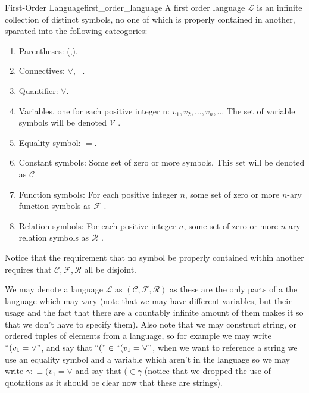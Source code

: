 \begin{definition}{First-Order Language}{first_order_language}
    A first order language $\mathcal{L}$ is an infinite collection of distinct
    symbols, no one of which is properly contained in another, sparated into the
    following cateogories:
	\begin{enumerate}
		\item Parentheses: (,).
		\item Connectives: $\lor, \neg$.
		\item Quantifier: $\forall$.
        \item Variables, one for each positive integer n: $v_{1}, v_{2}, \ldots,
        v_{n}, \ldots$ The set of variable symbols will be denoted $ \mathcal{ V
        }   $ .
        \item Equality symbol: $=$.
        \item Constant symbols: Some set of zero or more symbols. This set will
        be denoted as $ \mathcal{ C }   $ 
        \item Function symbols: For each positive integer $n$, some set of zero
        or more $n$-ary function symbols as $ \mathcal{ F }  $ .
        \item Relation symbols: For each positive integer $n$, some set of zero
        or more $n$-ary relation symbols as $ \mathcal{ R }  $ .
	\end{enumerate}
	Notice that the requirement that no symbol be properly contained within
	another requires that $ \mathcal{ C } , \mathcal{ F } , \mathcal{ R }     $
	all be disjoint.
\end{definition}
We may denote a language $ \mathcal{ L }   $ as $ \left( \mathcal{ C } ,
\mathcal{ F } , \mathcal{ R }      \right)  $ as these are the only parts of a
the language which may vary (note that we may have different variables, but
their usage and the fact that there are a countably infinite amount of them
makes it so that we don't have to specify them). Also note that we may construct
string, or ordered tuples of elements from a language, so for example we may
write $ ``( v _{ 1 } = \lor"  $, and say that $ ``(" \in ``( v _{ 1 } = \lor"
$, when we want to reference a string we use an equality symbol and a variable
which aren't in the language so we may write $ \gamma :\equiv ( v _{ 1 } = \lor
$ and say that $ ( \in  \gamma $ (notice that we dropped the use of quotations
as it should be clear now that these are strings).
